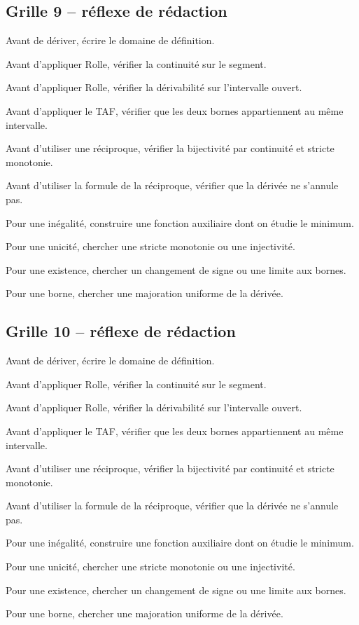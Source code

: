 \documentclass[11pt,a4paper]{article}
\begin{document}
\subsection*{Grille 9 -- réflexe de rédaction}

\begin{methodebox}

Avant de dériver, écrire le domaine de définition.

Avant d'appliquer Rolle, vérifier la continuité sur le segment.

Avant d'appliquer Rolle, vérifier la dérivabilité sur l'intervalle ouvert.

Avant d'appliquer le TAF, vérifier que les deux bornes appartiennent au même intervalle.

Avant d'utiliser une réciproque, vérifier la bijectivité par continuité et stricte monotonie.

Avant d'utiliser la formule de la réciproque, vérifier que la dérivée ne s'annule pas.

Pour une inégalité, construire une fonction auxiliaire dont on étudie le minimum.

Pour une unicité, chercher une stricte monotonie ou une injectivité.

Pour une existence, chercher un changement de signe ou une limite aux bornes.

Pour une borne, chercher une majoration uniforme de la dérivée.

\end{methodebox}

\subsection*{Grille 10 -- réflexe de rédaction}

\begin{methodebox}

Avant de dériver, écrire le domaine de définition.

Avant d'appliquer Rolle, vérifier la continuité sur le segment.

Avant d'appliquer Rolle, vérifier la dérivabilité sur l'intervalle ouvert.

Avant d'appliquer le TAF, vérifier que les deux bornes appartiennent au même intervalle.

Avant d'utiliser une réciproque, vérifier la bijectivité par continuité et stricte monotonie.

Avant d'utiliser la formule de la réciproque, vérifier que la dérivée ne s'annule pas.

Pour une inégalité, construire une fonction auxiliaire dont on étudie le minimum.

Pour une unicité, chercher une stricte monotonie ou une injectivité.

Pour une existence, chercher un changement de signe ou une limite aux bornes.

Pour une borne, chercher une majoration uniforme de la dérivée.

\end{methodebox}
\end{document}
